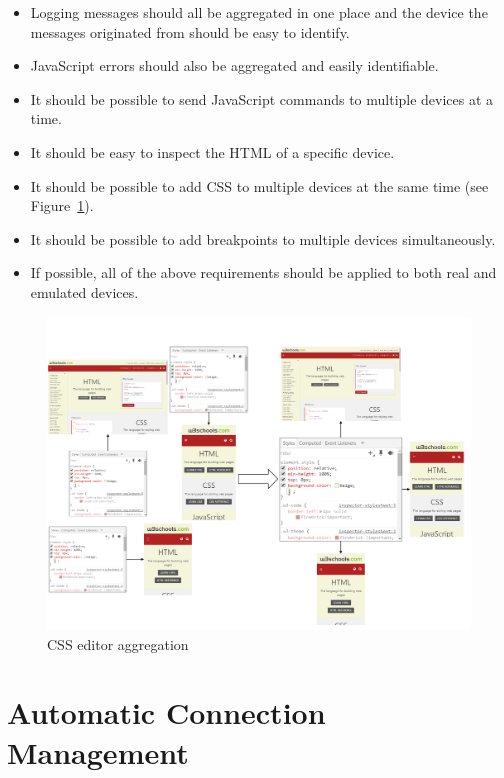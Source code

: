 \begin{itemize}
	\item Logging messages should all be aggregated in one place and the device the messages originated from should be easy to identify.
	\item JavaScript errors should also be aggregated and easily identifiable.
	\item It should be possible to send JavaScript commands to multiple devices at a time. 
	\item It should be easy to inspect the HTML of a specific device.
	\item It should be possible to add CSS to multiple devices at the same time (see Figure~\ref{fig:css_aggregation}).
	\item It should be possible to add breakpoints to multiple devices simultaneously.
	\item If possible, all of the above requirements should be applied to both real and emulated devices.
\end{itemize}

\begin{figure}[H]
  \centering
    \includegraphics[width=1.0\textwidth]{images/css_aggregation_4.pdf}
	\caption[CSS editor aggregation]{CSS editor aggregation}
	\label{fig:css_aggregation}
\end{figure}

\section{Automatic Connection Management}

